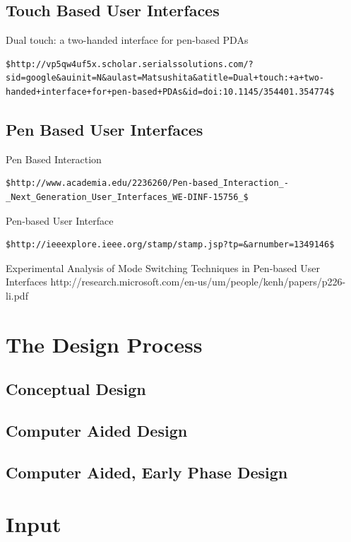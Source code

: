 \documentclass{article}
\begin{document}
\subsection{Touch Based User Interfaces}

Dual touch: a two-handed interface for pen-based PDAs
\begin{verbatim}
$http://vp5qw4uf5x.scholar.serialssolutions.com/?sid=google&auinit=N&aulast=Matsushita&atitle=Dual+touch:+a+two-handed+interface+for+pen-based+PDAs&id=doi:10.1145/354401.354774$
\end{verbatim}
\subsection{Pen Based User Interfaces}

Pen Based Interaction 
\begin{verbatim}
$http://www.academia.edu/2236260/Pen-based_Interaction_-_Next_Generation_User_Interfaces_WE-DINF-15756_$
\end{verbatim}
Pen-based User Interface 
\begin{verbatim}
$http://ieeexplore.ieee.org/stamp/stamp.jsp?tp=&arnumber=1349146$
\end{verbatim}
Experimental Analysis of Mode Switching Techniques in Pen-based User Interfaces http://research.microsoft.com/en-us/um/people/kenh/papers/p226-li.pdf

\section{The Design Process}

\subsection{Conceptual Design}

\subsection{Computer Aided Design}

\subsection{Computer Aided, Early Phase Design}

\section{Input}
\end{document}
